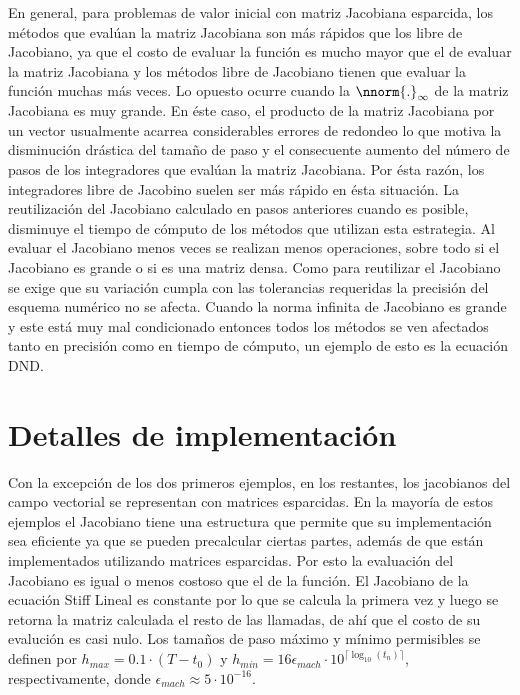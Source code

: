 En general, para problemas de valor inicial con matriz Jacobiana esparcida, los m\'etodos que eval\'uan la matriz Jacobiana son m\'as r\'apidos que los libre de Jacobiano, ya que el costo de evaluar la funci\'on es mucho mayor que el de evaluar la matriz Jacobiana y los métodos libre de Jacobiano tienen que evaluar la funci\'on muchas más veces. Lo opuesto ocurre cuando la $\nnorm{.}_\infty$ de la matriz Jacobiana es muy grande. En éste caso, el producto de la matriz Jacobiana por un vector usualmente acarrea considerables errores de redondeo lo que motiva la disminución drástica del tamaño de paso y el consecuente aumento del número de pasos de los integradores que eval\'uan la matriz Jacobiana. Por ésta razón, los integradores libre de Jacobino suelen ser más rápido en ésta situación. 
La reutilización del Jacobiano calculado en pasos anteriores cuando es posible, disminuye el tiempo de cómputo de los métodos que utilizan esta estrategia. Al evaluar el Jacobiano menos veces se realizan menos  operaciones, sobre todo si el Jacobiano es grande o si es una matriz densa. Como para reutilizar el Jacobiano se exige que su variación cumpla con las tolerancias requeridas la precisión del esquema numérico no se afecta.
Cuando la norma infinita de Jacobiano es grande y este está muy mal condicionado entonces todos los métodos se ven afectados tanto en precisión como en tiempo de cómputo, un ejemplo de esto es la ecuación DND.
 

\section{Detalles de implementaci\'on}

Con la excepción de los dos primeros ejemplos, en los restantes, los jacobianos del campo vectorial se representan con matrices esparcidas. En la mayor\'ia de estos ejemplos el Jacobiano tiene una estructura que permite que su implementaci\'on sea eficiente ya que se pueden precalcular ciertas partes, adem\'as de que est\'an implementados utilizando matrices esparcidas. Por esto la evaluaci\'on del Jacobiano es igual o menos costoso que el de la funci\'on. El Jacobiano de la ecuaci\'on Stiff Lineal es constante por lo que se
calcula la primera vez y luego se retorna la matriz calculada el resto de las llamadas, de ahí que el costo de su evalución es casi nulo. 
Los tamaños de paso máximo y mínimo permisibles se definen por $h_{max}=0\mathord{.}1\cdot(T-t_0)$ y $h_{min}=16\epsilon_{mach}\cdot 10^{\lceil\log_{10}(t_n)\rceil}$, respectivamente, donde $\epsilon_{mach}\approx 5\cdot 10^{-16}$.










%
%